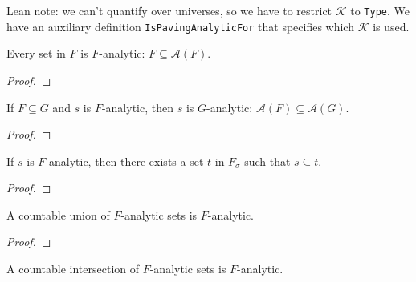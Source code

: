 Lean note: we can't quantify over universes, so we have to restrict $\mathcal{K}$ to \texttt{Type}. We have an auxiliary definition \texttt{IsPavingAnalyticFor} that specifies which $\mathcal{K}$ is used.


\begin{lemma}\label{lem:isPavingAnalytic_of_prop}
  \leanok
Every set in $F$ is $F$-analytic: $F \subseteq \mathcal{A}(F)$.
\end{lemma}

\begin{proof}\leanok

\end{proof}


\begin{lemma}\label{lem:IsPavingAnalytic.mono}
  \leanok
If $F \subseteq G$ and $s$ is $F$-analytic, then $s$ is $G$-analytic: $\mathcal{A}(F) \subseteq \mathcal{A}(G)$.
\end{lemma}

\begin{proof}\leanok

\end{proof}


\begin{lemma}\label{lem:IsPavingAnalytic.exists_mem_countableSupClosure_superset}
  \leanok
If $s$ is $F$-analytic, then there exists a set $t$ in $F_\sigma$ such that $s \subseteq t$.
\end{lemma}

\begin{proof}\leanok

\end{proof}


\begin{lemma}\label{lem:IsPavingAnalytic.iUnion}
  \leanok
A countable union of $F$-analytic sets is $F$-analytic.
\end{lemma}

\begin{proof}\leanok

\end{proof}


\begin{lemma}\label{lem:IsPavingAnalytic.iInter}
  \leanok
A countable intersection of $F$-analytic sets is $F$-analytic.
\end{lemma}

